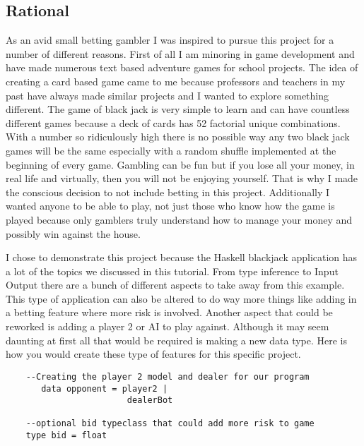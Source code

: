 \documentclass{article}
\begin{document}
    \subsection{Rational}
    As an avid small betting gambler I was inspired to pursue this project for a number of different reasons. First of all I am minoring in game development and have made numerous text based adventure games for school projects. The idea of creating a card based game came to me because professors and teachers in my past have always made similar projects and I wanted to explore something different. The game of black jack is very simple to learn and can have countless different games because a deck of cards has 52 factorial unique combinations. With a number so ridiculously high there is no possible way any two black jack games will be the same especially with a random shuffle implemented at the beginning of every game. Gambling can be fun but if you lose all your money, in real life and virtually, then you will not be enjoying yourself. That is why I made the conscious decision to not include betting in this project. Additionally I wanted anyone to be able to play, not just those who know how the game is played because only gamblers truly understand how to manage your money and possibly win against the house.
    
    \medskip I chose to demonstrate this project because the Haskell blackjack application has a lot of the topics we discussed in this tutorial. From type inference to Input Output there are a bunch of different aspects to take away from this example. This type of application can also be altered to do way more things like adding in a betting feature where more risk is involved. Another aspect that could be reworked is adding a player 2 or AI to play against. Although it may seem daunting at first all that would be required is making a new data type. Here is how you would create these type of features for this specific project.
    
    \begin{lstlisting}
    --Creating the player 2 model and dealer for our program
       data opponent = player2 | 
                        dealerBot
    
    --optional bid typeclass that could add more risk to game
    type bid = float
    \end{lstlisting}
    
    
    
\end{document}
